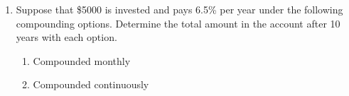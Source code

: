 \begin{enumerate}
\begin{enumerate}
\vfill


\end{enumerate}



\vfill
\newpage

\item  Suppose that \$5000 is invested and pays 6.5\% per year under the following compounding options.  Determine the total amount in the account after 10 years with each option.

\begin{enumerate}
\item  Compounded monthly
\vfill
\item  Compounded continuously
\vfill

\end{enumerate}




\end{enumerate}



